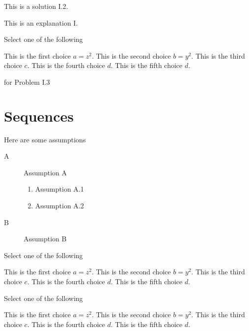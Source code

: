 \begin{mproblem}
\begin{problem}[20][Problem I.2]
\solution
This is a solution I.2.

\explain
This is an explanation I.

\end{problem}







\begin{problem}[40][Problem I.3]
\label{quiz-ii:2}
Select one of the following
\begin{xchoice}
\choice This is the first choice $a = z^2$.
\choice This is the second choice $b = y^2$.
\choice* This is the third choice $c$.
\choice* This is the fourth choice $d$.
\choice This is the fifth choice $d$.
\end{xchoice}

\help  for Problem I.3
\end{problem}

\end{mproblem}

\newpage
\section{Sequences}
\label{sec:quiz-ii::middle}

\begin{gram}
Here are some assumptions
\begin{description}
\item[A] Assumption A
\begin{enumerate}
\item Assumption A.1
\item Assumption A.2
\end{enumerate}

\item[B] Assumption B
\end{description}
\end{gram}


\begin{problem}[70][Xchoice I]
Select one of the following
\begin{xchoice}
\choice This is the first choice $a = z^2$.
\choice This is the second choice $b = y^2$.
\choice* This is the third choice $c$.
\choice* This is the fourth choice $d$.
\choice This is the fifth choice $d$.
\end{xchoice}
\end{problem}

\begin{problem}[80][Xchoice I.2]
Select one of the following
\begin{xchoice}
\choice This is the first choice $a = z^2$.
\choice This is the second choice $b = y^2$.
\choice* This is the third choice $c$.
\choice* This is the fourth choice $d$.
\choice This is the fifth choice $d$.
\end{xchoice}
\end{problem}



